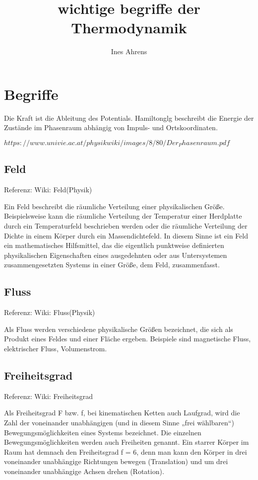 \documentclass[]{article}
\title{wichtige begriffe der Thermodynamik}
\author{Ines Ahrens}
\begin{document}
\maketitle



\section{Begriffe}

Die Kraft ist die Ableitung des Potentials.
Hamiltonglg beschreibt die Energie der Zustände im Phasenraum abhängig von Impuls- und Ortskoordinaten.

$https://www.univie.ac.at/physikwiki/images/8/80/Der_Phasenraum.pdf$

\subsection{Feld}
Referenz: Wiki: Feld(Physik)

Ein Feld beschreibt die räumliche Verteilung einer physikalischen Größe. Beispielsweise kann die räumliche Verteilung der Temperatur einer Herdplatte durch ein Temperaturfeld beschrieben werden oder die räumliche Verteilung der Dichte in einem Körper durch ein Massendichtefeld. In diesem Sinne ist ein Feld ein mathematisches Hilfsmittel, das die eigentlich punktweise definierten physikalischen Eigenschaften eines ausgedehnten oder aus Untersystemen zusammengesetzten Systems in einer Größe, dem Feld, zusammenfasst.

\subsection{Fluss}
Referenz: Wiki: Fluss(Physik) 

Als Fluss werden verschiedene physikalische Größen bezeichnet, die sich als Produkt eines Feldes und einer Fläche ergeben. Beispiele sind magnetische Fluss, elektrischer Fluss, Volumenstrom. 

\subsection{Freiheitsgrad}
Referenz: Wiki: Freiheitsgrad

Als Freiheitsgrad F bzw. f, bei kinematischen Ketten auch Laufgrad, wird die Zahl der voneinander unabhängigen (und in diesem Sinne „frei wählbaren“) Bewegungsmöglichkeiten eines Systems bezeichnet. Die einzelnen Bewegungsmöglichkeiten werden auch Freiheiten genannt. Ein starrer Körper im Raum hat demnach den Freiheitsgrad f = 6, denn man kann den Körper in drei voneinander unabhängige Richtungen bewegen (Translation) und um drei voneinander unabhängige Achsen drehen (Rotation).
\end{document}
